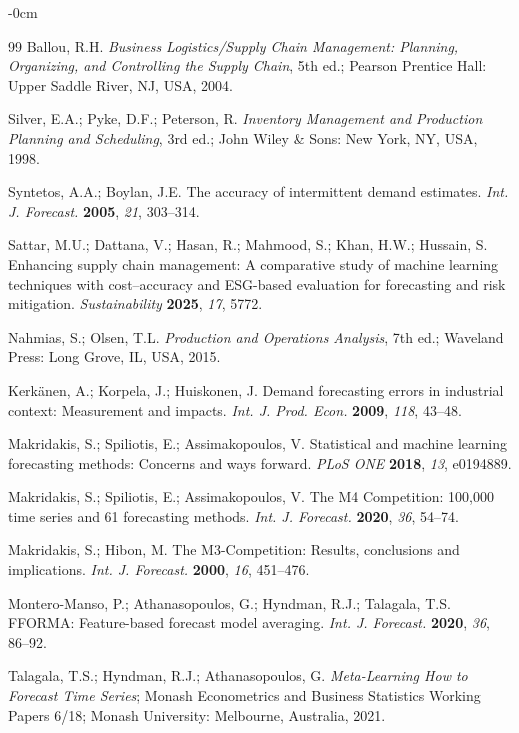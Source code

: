 \documentclass[forecasting,article,submit,pdftex,moreauthors]{Definitions/mdpi}
\begin{document}
\begin{adjustwidth}{-\extralength}{0cm}
\begin{thebibliography}{99}
Ballou, R.H. \textit{Business Logistics/Supply Chain Management: Planning, Organizing, and Controlling the Supply Chain}, 5th ed.; Pearson Prentice Hall: Upper Saddle River, NJ, USA, 2004.

Silver, E.A.; Pyke, D.F.; Peterson, R. \textit{Inventory Management and Production Planning and Scheduling}, 3rd ed.; John Wiley \& Sons: New York, NY, USA, 1998.

Syntetos, A.A.; Boylan, J.E. The accuracy of intermittent demand estimates. \textit{Int. J. Forecast.} \textbf{2005}, \textit{21}, 303--314.

Sattar, M.U.; Dattana, V.; Hasan, R.; Mahmood, S.; Khan, H.W.; Hussain, S. Enhancing supply chain management: A comparative study of machine learning techniques with cost--accuracy and ESG-based evaluation for forecasting and risk mitigation. \textit{Sustainability} \textbf{2025}, \textit{17}, 5772.

Nahmias, S.; Olsen, T.L. \textit{Production and Operations Analysis}, 7th ed.; Waveland Press: Long Grove, IL, USA, 2015.

Kerk\"{a}nen, A.; Korpela, J.; Huiskonen, J. Demand forecasting errors in industrial context: Measurement and impacts. \textit{Int. J. Prod. Econ.} \textbf{2009}, \textit{118}, 43--48.

Makridakis, S.; Spiliotis, E.; Assimakopoulos, V. Statistical and machine learning forecasting methods: Concerns and ways forward. \textit{PLoS ONE} \textbf{2018}, \textit{13}, e0194889.

Makridakis, S.; Spiliotis, E.; Assimakopoulos, V. The M4 Competition: 100,000 time series and 61 forecasting methods. \textit{Int. J. Forecast.} \textbf{2020}, \textit{36}, 54--74.

Makridakis, S.; Hibon, M. The M3-Competition: Results, conclusions and implications. \textit{Int. J. Forecast.} \textbf{2000}, \textit{16}, 451--476.

Montero-Manso, P.; Athanasopoulos, G.; Hyndman, R.J.; Talagala, T.S. FFORMA: Feature-based forecast model averaging. \textit{Int. J. Forecast.} \textbf{2020}, \textit{36}, 86--92.

Talagala, T.S.; Hyndman, R.J.; Athanasopoulos, G. \textit{Meta-Learning How to Forecast Time Series}; Monash Econometrics and Business Statistics Working Papers 6/18; Monash University: Melbourne, Australia, 2021.


\end{thebibliography}
\end{adjustwidth}
\end{document}
